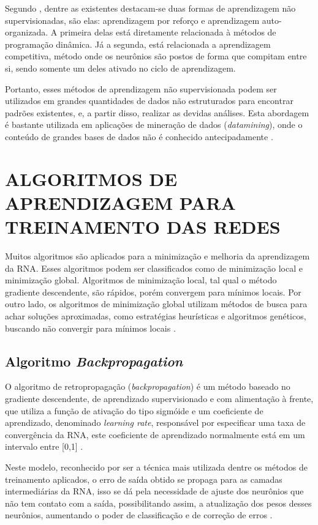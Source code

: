 Segundo , dentre as existentes destacam-se duas formas de aprendizagem não supervisionadas, são elas: aprendizagem por reforço e aprendizagem auto-organizada. A primeira delas está diretamente relacionada à métodos de programação dinâmica. Já a segunda, está relacionada a aprendizagem competitiva, método onde os neurônios são postos de forma que compitam entre si, sendo somente um deles ativado no ciclo de aprendizagem.

Portanto, esses métodos de aprendizagem não supervisionada podem ser utilizados em grandes quantidades de dados não estruturados para encontrar padrões existentes, e, a partir disso, realizar as devidas análises. Esta abordagem é bastante utilizada em aplicações de mineração de dados (\textit{datamining}), onde o conteúdo de grandes bases de dados não é conhecido antecipadamente \cite{elpink}.

\section{ALGORITMOS DE APRENDIZAGEM PARA TREINAMENTO DAS REDES}\label{algoritmos-aprendizagem}
Muitos algoritmos são aplicados para a minimização e melhoria da aprendizagem da RNA. Esses algoritmos podem ser classificados como de minimização local e minimização global. Algoritmos de minimização local, tal qual o método gradiente descendente, são rápidos, porém convergem para mínimos locais. Por outro lado, os algoritmos de minimização global utilizam métodos de busca para achar soluções aproximadas, como estratégias heurísticas e algoritmos genéticos, buscando não convergir para mínimos locais \cite{haykin2000}.

\subsection{Algoritmo \textit{Backpropagation}}
O algoritmo de retropropagação (\textit{backpropagation}) é um método baseado no gradiente descendente, de aprendizado supervisionado e com alimentação à frente, que utiliza a função de ativação do tipo sigmóide e um coeficiente de aprendizado, denominado \textit{learning rate}, responsável por especificar uma taxa de convergência da RNA, este coeficiente de aprendizado normalmente está em um intervalo entre [0,1]    \cite{haykin2000}.

Neste modelo, reconhecido por ser a técnica mais utilizada dentre os métodos de treinamento aplicados, o erro de saída obtido se propaga para as camadas intermediárias da RNA, isso se dá pela necessidade de ajuste dos neurônios que não tem contato com a saída, possibilitando assim, a atualização dos pesos desses neurônios, aumentando o poder de classificação e de correção de erros \cite{medeiros}.

